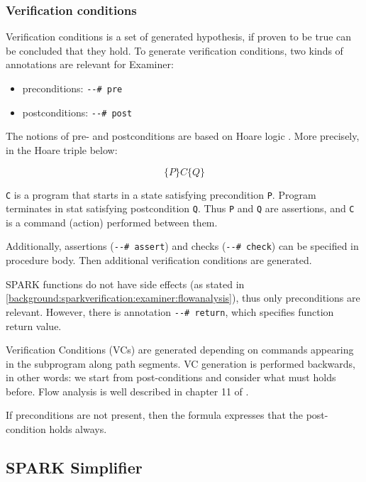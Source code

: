 \subsubsection{Verification conditions}
\label{background:sparkverification:examiner:vc}

Verification conditions is a set of generated hypothesis, if proven to be true can be concluded that they hold. To generate verification conditions, two kinds of annotations are relevant for Examiner:
\begin{itemize}
	\item preconditions: \lstinline{--# pre}
	\item postconditions: \lstinline{--# post}
\end{itemize}

The notions of pre- and postconditions are based on Hoare logic \cite{HoareLogic:Paper}. More precisely, in the Hoare triple below: 

\begin{equation} \label{eq:hoare_triple}
	\{P\} C \{Q\}
\end{equation}

\lstinline{C} is a program that starts in a state satisfying precondition \lstinline{P}. Program terminates in stat satisfying postcondition \lstinline{Q}. Thus \lstinline{P} and \lstinline{Q} are assertions, and \lstinline{C} is a command (action) performed between them.

Additionally, assertions (\lstinline{--# assert}) and checks (\lstinline{--# check}) can be specified in procedure body. Then additional verification conditions are generated.

SPARK functions do not have side effects (as stated in \ref{background:sparkverification:examiner:flowanalysis}), thus only preconditions are relevant. However, there is annotation \lstinline{--# return}, which specifies function return value.

Verification Conditions (VCs) are generated depending on commands appearing in the subprogram along path segments. VC generation is performed backwards, in other words: we start from post-conditions and consider what must holds before. Flow analysis is well described in chapter 11 of \cite{Barnes:Book}.

If preconditions are not present, then the formula expresses that the post-condition holds always.



\subsection{SPARK Simplifier}
\label{background:sparkverification:simplifier}

